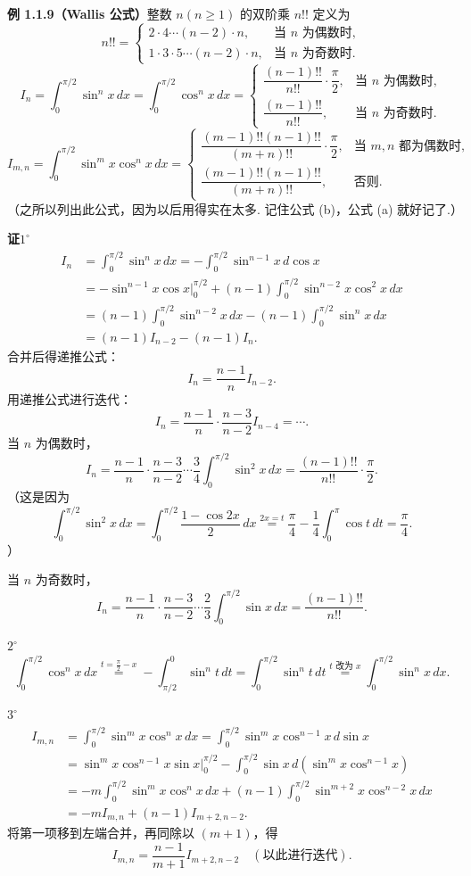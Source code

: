 \documentclass[UTF8,12pt,a4paper,fontset=fandol]{ctexart}
\begin{document}
\noindent\textbf{例 1.1.9（Wallis 公式）}\quad 整数 $n(n\ge1)$ 的双阶乘 $n!!$ 定义为
\[
n!!=
\begin{cases}
2\cdot4\cdots(n-2)\cdot n, & \text{当 }n\text{ 为偶数时},\\
1\cdot3\cdot5\cdots(n-2)\cdot n, & \text{当 }n\text{ 为奇数时}.
\end{cases}
\]
\[
I_n=\int_0^{\pi/2}\sin^n x\,dx=\int_0^{\pi/2}\cos^n x\,dx=
\begin{cases}
\dfrac{(n-1)!!}{n!!}\cdot\dfrac\pi2, & \text{当 }n\text{ 为偶数时},\\[0.8em]
\dfrac{(n-1)!!}{n!!}, & \text{当 }n\text{ 为奇数时}.
\end{cases}
\tag{a}
\]
\[
I_{m,n}=\int_0^{\pi/2}\sin^m x\cos^n x\,dx=
\begin{cases}
\dfrac{(m-1)!!(n-1)!!}{(m+n)!!}\cdot\dfrac\pi2, & \text{当 }m,n\text{ 都为偶数时},\\[0.8em]
\dfrac{(m-1)!!(n-1)!!}{(m+n)!!}, & \text{否则}.
\end{cases}
\tag{b}
\]
（之所以列出此公式，因为以后用得实在太多. 记住公式 (b)，公式 (a) 就好记了.）

\noindent\textbf{证}\quad $1^\circ$
\[
\begin{aligned}
I_n&=\int_0^{\pi/2}\sin^n x\,dx
=-\int_0^{\pi/2}\sin^{n-1}x\,d\cos x\\
&=-\sin^{n-1}x\cos x\bigg|_0^{\pi/2}
 +(n-1)\int_0^{\pi/2}\sin^{n-2}x\cos^2x\,dx\\
&=(n-1)\int_0^{\pi/2}\sin^{n-2}x\,dx
 -(n-1)\int_0^{\pi/2}\sin^n x\,dx\\
&=(n-1)I_{n-2}-(n-1)I_n.
\end{aligned}
\]
合并后得递推公式：
\[
  I_n=\frac{n-1}{n}I_{n-2}.
\]
用递推公式进行迭代：
\[
  I_n=\frac{n-1}{n}\cdot\frac{n-3}{n-2}I_{n-4}=\cdots.
\]
当 $n$ 为偶数时，
\[
  I_n=\frac{n-1}{n}\cdot\frac{n-3}{n-2}\cdots\frac34\int_0^{\pi/2}\sin^2x\,dx
  =\frac{(n-1)!!}{n!!}\cdot\frac\pi2.
\]
（这是因为
\[
\int_0^{\pi/2}\sin^2x\,dx
=\int_0^{\pi/2}\frac{1-\cos2x}{2}\,dx
\overset{2x=t}{=}\frac\pi4-\frac14\int_0^\pi\cos t\,dt=\frac\pi4.
\]
）

当 $n$ 为奇数时，
\[
  I_n=\frac{n-1}{n}\cdot\frac{n-3}{n-2}\cdots\frac23\int_0^{\pi/2}\sin x\,dx
  =\frac{(n-1)!!}{n!!}.
\]

$2^\circ$
\[
  \int_0^{\pi/2}\cos^n x\,dx
  \overset{t=\frac\pi2-x}{=}
  -\int_{\pi/2}^0\sin^n t\,dt
  =\int_0^{\pi/2}\sin^n t\,dt
  \overset{t\text{ 改为 }x}{=}
  \int_0^{\pi/2}\sin^n x\,dx.
\]

$3^\circ$
\[
\begin{aligned}
I_{m,n}
&=\int_0^{\pi/2}\sin^m x\cos^n x\,dx
=\int_0^{\pi/2}\sin^m x\cos^{n-1}x\,d\sin x\\
&=\sin^m x\cos^{n-1}x\sin x\bigg|_0^{\pi/2}
  -\int_0^{\pi/2}\sin x\,d(\sin^m x\cos^{n-1}x)\\
&=-m\int_0^{\pi/2}\sin^m x\cos^n x\,dx
  +(n-1)\int_0^{\pi/2}\sin^{m+2}x\cos^{n-2}x\,dx\\
&=-mI_{m,n}+(n-1)I_{m+2,n-2}.
\end{aligned}
\]
将第一项移到左端合并，再同除以 $(m+1)$，得
\[
  I_{m,n}=\frac{n-1}{m+1}I_{m+2,n-2}\quad(\text{以此进行迭代}).
\]
\end{document}
